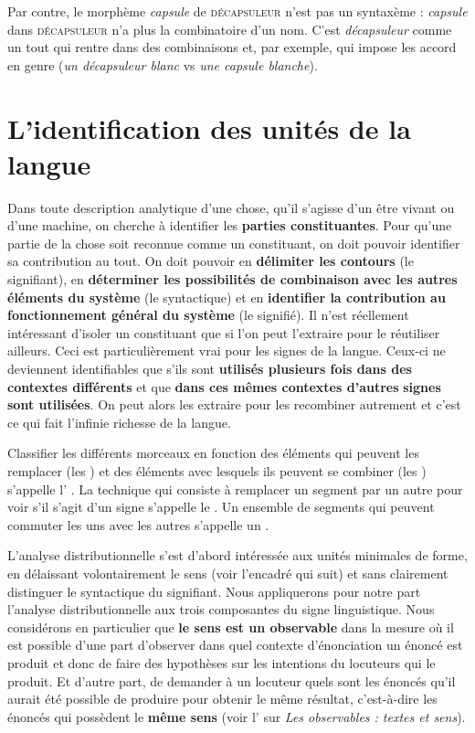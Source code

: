 Par contre, le morphème \textit{capsule} de \textsc{décapsuleur} n’est pas un syntaxème : \textit{capsule} dans \textsc{décapsuleur} n’a plus la combinatoire d’un nom. C’est \textit{décapsuleur} comme un tout qui rentre dans des combinaisons et, par exemple, qui impose les accord en genre (\textit{un décapsuleur blanc} vs \textit{une capsule blanche}).

\section{L’identification des unités de la langue}\label{sec:2.1.7}

Dans toute description analytique d’une chose, qu’il s’agisse d’un être vivant ou d’une machine, on cherche à identifier les \textbf{parties constituantes}. Pour qu’une partie de la chose soit reconnue comme un constituant, on doit pouvoir identifier sa contribution au tout. On doit pouvoir en \textbf{délimiter les contours} (le signifiant), en \textbf{déterminer les possibilités de combinaison avec les autres éléments du système} (le syntactique) et en \textbf{identifier la contribution au fonctionnement général du système} (le signifié). Il n’est réellement intéressant d’isoler un constituant que si l’on peut l’extraire pour le réutiliser ailleurs. Ceci est particulièrement vrai pour les signes de la langue. Ceux-ci ne deviennent identifiables que s’ils sont \textbf{utilisés plusieurs fois dans des contextes différents} et que \textbf{dans ces mêmes contextes d’autres} \textbf{signes sont utilisées}. On peut alors les extraire pour les recombiner autrement et c’est ce qui fait l’infinie richesse de la langue.

Classifier les différents morceaux en fonction des éléments qui peuvent les remplacer (les ) et des éléments avec lesquels ils peuvent se combiner (les ) s’appelle l’ . La technique qui consiste à remplacer un segment par un autre pour voir s’il s’agit d’un signe s’appelle le . Un ensemble de segments qui peuvent commuter les uns avec les autres s’appelle un .

L’analyse distributionnelle s’est d’abord intéressée aux unités minimales de forme, en délaissant volontairement le sens (voir l’encadré qui suit) et sans clairement distinguer le syntactique du signifiant. Nous appliquerons pour notre part l’analyse distributionnelle aux trois composantes du signe linguistique. Nous considérons en particulier que \textbf{le sens est un observable} dans la mesure où il est possible d’une part d’observer dans quel contexte d’énonciation un énoncé est produit et donc de faire des hypothèses sur les intentions du locuteurs qui le produit. Et d’autre part, de demander à un locuteur quels sont les énoncés qu’il aurait été possible de produire pour obtenir le même résultat, c’est-à-dire les énoncés qui possèdent le \textbf{même sens} (voir l’ sur \textit{Les observables : textes et sens}).

